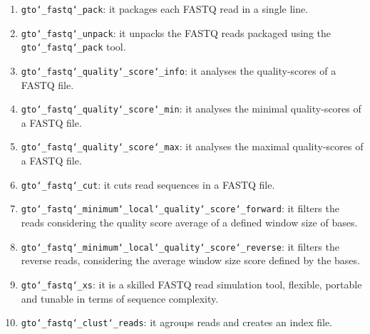 \begin{enumerate}
\item \texttt{gto\char`_fastq\char`_pack}: it packages each FASTQ read in a single line.

\item \texttt{gto\char`_fastq\char`_unpack}: it unpacks the FASTQ reads packaged using the \texttt{gto\char`_fastq\char`_pack} tool.

\item \texttt{gto\char`_fastq\char`_quality\char`_score\char`_info}: it analyses the quality-scores of a FASTQ file.

\item \texttt{gto\char`_fastq\char`_quality\char`_score\char`_min}: it analyses the minimal quality-scores of a FASTQ file.

\item \texttt{gto\char`_fastq\char`_quality\char`_score\char`_max}: it analyses the maximal quality-scores of a FASTQ file.

\item \texttt{gto\char`_fastq\char`_cut}: it cuts read sequences in a FASTQ file. 

\item \texttt{gto\char`_fastq\char`_minimum\char`_local\char`_quality\char`_score\char`_forward}: it filters the reads considering the quality score average of a defined window size of bases.

\item \texttt{gto\char`_fastq\char`_minimum\char`_local\char`_quality\char`_score\char`_reverse}: it filters the reverse reads, considering the average window size score defined by the bases.

\item \texttt{gto\char`_fastq\char`_xs}: it is a skilled FASTQ read simulation tool, flexible, portable and tunable in terms of sequence complexity.

\item \texttt{gto\char`_fastq\char`_clust\char`_reads}: it agroups reads and creates an index file.

\end{enumerate}






























